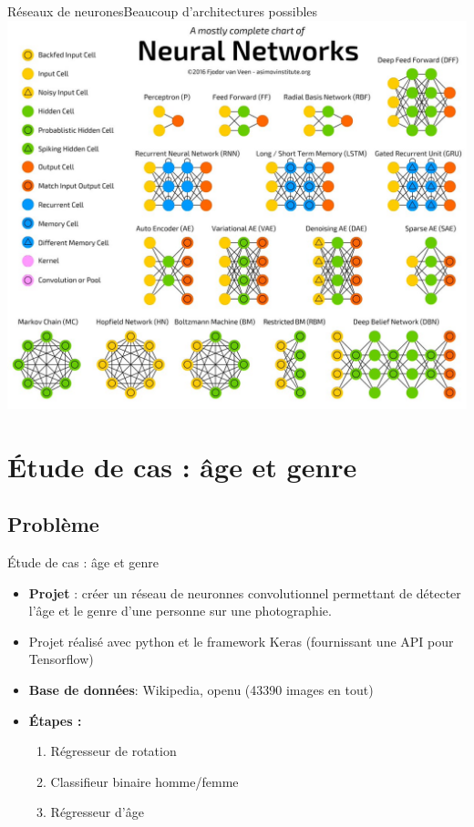\documentclass[compress]{beamer}
\begin{document}
\begin{frame}{Réseaux de neurones}{Beaucoup d'architectures possibles}
	\centering
	\includegraphics[width=0.82\linewidth]{resources/clem/architectures}
\end{frame}

\section{\'Etude de cas : âge et genre}
\subsection{Problème}
\begin{frame}{\'Etude de cas : âge et genre}
  \begin{itemize}
    \item
    \textbf{\color{fibeamer@orange}Projet} : créer un réseau de neuronnes convolutionnel
    permettant de détecter l'{\color{fibeamer@orange}âge} et le {\color{fibeamer@orange}genre} d'une personne sur une photographie.
    \item Projet réalisé avec python et le framework Keras (fournissant une API pour Tensorflow)
    \item \textbf{\color{fibeamer@orange}Base de données}: Wikipedia, openu (43390 images en tout)
    \item \textbf{\color{fibeamer@orange}\'Etapes :}
    \begin{enumerate}
      \item Régresseur de rotation
      \item Classifieur binaire homme/femme
      \item Régresseur d'âge
    \end{enumerate}
  \end{itemize}
\end{frame}
\end{document}
